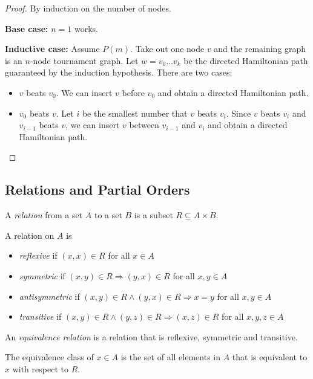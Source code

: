 \documentclass[11pt]{article}
\begin{document}
\begin{proof}
By induction on the number of nodes.

\textbf{Base case:} $n=1$ works.

\textbf{Inductive case:} Assume $P(m)$. Take out one node $v$ and the remaining graph is an
$n$-node tournament graph. Let $w=v_0 \dots v_k$ be the directed Hamiltonian path guaranteed by the
induction hypothesis. There are two cases:
\begin{itemize}
\item $v$ beats $v_0$. We can insert $v$ before $v_0$ and obtain a directed Hamiltonian path.
\item $v_0$ beats $v$. Let $i$ be the smallest number that $v$ beats $v_i$. Since $v$ beats $v_i$
and $v_{i-1}$ beats $v$, we can insert $v$ between $v_{i-1}$ and $v_i$ and obtain a directed
Hamiltonian path.
\end{itemize}
\end{proof}

\subsection{Relations and Partial Orders}

\begin{definition}
A \emph{relation} from a set $A$ to a set $B$ is a subset $R \subseteq A \times B$.
\end{definition}

\begin{definition}
A relation on $A$ is
\begin{itemize}
\item \emph{reflexive} if $(x,x) \in R$ for all $x \in A$
\item \emph{symmetric} if $(x,y) \in R \Rightarrow (y,x) \in R$ for all $x,y \in A$
\item \emph{antisymmetric} if $(x,y) \in R \wedge (y,x) \in R \Rightarrow x = y$ for all
$x,y \in A$
\item \emph{transitive} if $(x,y) \in R \wedge (y,z) \in R \Rightarrow (x,z) \in R$ for all
$x,y,z \in A$
\end{itemize}
\end{definition}

\begin{definition}
An \emph{equivalence relation} is a relation that is reflexive, symmetric and transitive.
\end{definition}

\begin{definition}
The equivalence class of $x \in A$ is the set of all elements in $A$ that is equivalent to $x$ with
respect to $R$.
\end{definition}
\end{document}
